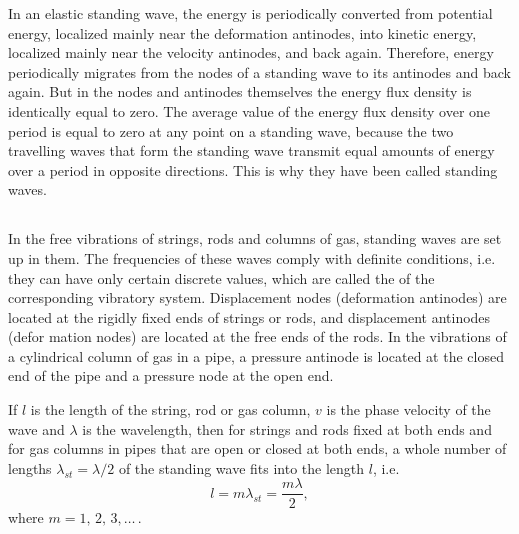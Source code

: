 In an elastic standing wave, the energy is periodically converted from potential energy, localized mainly near the deformation antinodes, into kinetic energy, localized mainly near the velocity antinodes, and back again. Therefore, energy periodically migrates from the nodes of a standing wave to its antinodes and back again. But in the nodes and antinodes themselves the energy flux density is identically equal to zero. The average value of the energy flux density over one period is equal to zero at any point on a standing wave, because the two travelling waves that form the standing wave transmit equal amounts of energy over a period in opposite directions. This is why they have been called standing waves.

\subsection{}\label{30.5.8} In the free vibrations of strings, rods and columns of gas, standing waves are set up in them. The frequencies of these waves comply with definite conditions, i.e. they can have only certain discrete values, which are called the  of the corresponding vibratory system. Displacement nodes (deformation antinodes) are located at the rigidly fixed ends of strings or rods, and displacement antinodes (defor­ mation nodes) are located at the free ends of the rods. In the vibrations of a cylindrical column of gas in a pipe, a pressure antinode is located at the closed end of the pipe and a pressure node at the open end.

If $l$ is the length of the string, rod or gas column, $v$ is the phase velocity of the wave and $\lambda$ is the wavelength, then for strings and rods fixed at both ends and for gas columns in pipes that are open or closed at both ends, a whole number of lengths $\lambda_{st} = \lambda/2$ of the standing wave fits into the length $l$, i.e.
\begin{equation*}%
l = m \lambda_{st} = \frac{m \lambda}{2}, 
\end{equation*}
where $m = 1,\,2,\,3,\ldots{\,}$.

